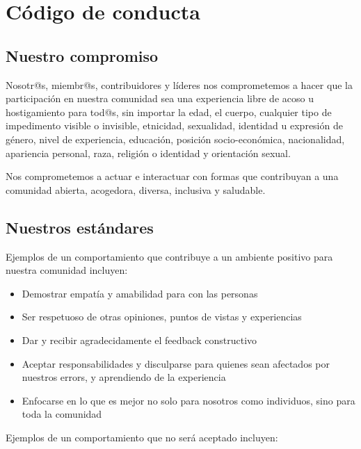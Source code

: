 \documentclass[
]{book}
\providecommand{\tightlist}{%
  \setlength{\itemsep}{0pt}\setlength{\parskip}{0pt}}
\begin{document}
\hypertarget{appendix-apuxe9ndice}{%
\appendix}


\hypertarget{codigo-de-conducta}{%
\chapter{Código de conducta}\label{codigo-de-conducta}}

\hypertarget{nuestro-compromiso}{%
\section{Nuestro compromiso}\label{nuestro-compromiso}}

Nosotr@s, miembr@s, contribuidores y líderes nos comprometemos a hacer que la participación en nuestra comunidad sea una experiencia libre de acoso u hostigamiento para tod@s, sin importar la edad, el cuerpo, cualquier tipo de impedimento visible o invisible, etnicidad, sexualidad, identidad u expresión de género, nivel de experiencia, educación, posición socio-económica, nacionalidad, apariencia personal, raza, religión o identidad y orientación sexual.

Nos comprometemos a actuar e interactuar con formas que contribuyan a una comunidad abierta, acogedora, diversa, inclusiva y saludable.

\hypertarget{nuestros-estuxe1ndares}{%
\section{Nuestros estándares}\label{nuestros-estuxe1ndares}}

Ejemplos de un comportamiento que contribuye a un ambiente positivo para nuestra comunidad incluyen:

\begin{itemize}
\tightlist
\item
  Demostrar empatía y amabilidad para con las personas
\item
  Ser respetuoso de otras opiniones, puntos de vistas y experiencias
\item
  Dar y recibir agradecidamente el feedback constructivo
\item
  Aceptar responsabilidades y disculparse para quienes sean afectados por nuestros errors, y aprendiendo de la experiencia
\item
  Enfocarse en lo que es mejor no solo para nosotros como individuos, sino para toda la comunidad
\end{itemize}

Ejemplos de un comportamiento que no será aceptado incluyen:
\end{document}
